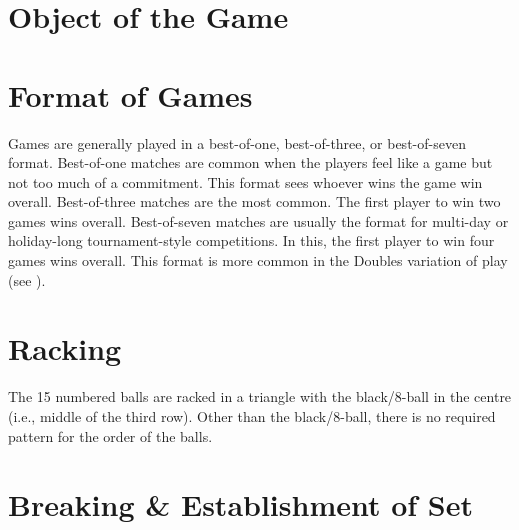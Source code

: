 
\section{Object of the Game} \label{8ball:description}

\section{Format of Games} \label{8ball:format}

 Games are generally played in a best-of-one, best-of-three, or best-of-seven format.%
\subruleitem Best-of-one matches are common when the players feel like a game but not too much of a commitment. This format sees whoever wins the game win overall.%
\subruleitem Best-of-three matches are the most common. The first player to win two games wins overall.%
\subruleitem Best-of-seven matches are usually the format for multi-day or holiday-long tournament-style competitions. In this, the first player to win four games wins overall. This format is more common in the Doubles variation of play (see ).%

\section{Racking} \label{8ball:racking}

 \RackingUp[8ball]%
\DetermineWhoRacks%
\TableDiagram[8ball]%
\subruleitem The 15 numbered balls are racked in a triangle with the black/8-ball in the centre (i.e., middle of the third row). Other than the black/8-ball, there is no required pattern for the order of the balls.%
\subruleitem \TightlyPacked%
\subruleitem \RackPlacement[8ball]%
\subruleitem \RackingTool[8ball]%
\subruleitem \RackInspection[8ball]%

\section{Breaking \& Establishment of Set} \label{8ball:breaking}

